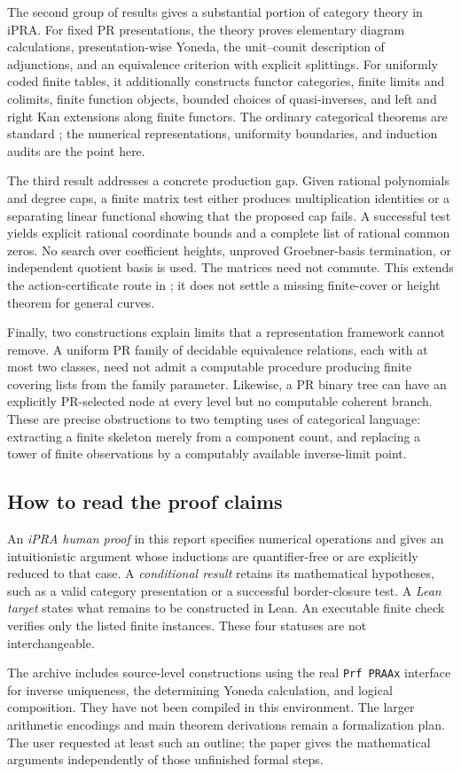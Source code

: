 The second group of results gives a substantial portion of category theory in
iPRA. For fixed PR presentations, the theory proves elementary diagram
calculations, presentation-wise Yoneda, the unit--counit description of
adjunctions, and an equivalence criterion with explicit splittings. For
uniformly coded finite tables, it additionally constructs functor categories,
finite limits and colimits, finite function objects, bounded choices of
quasi-inverses, and left and right Kan extensions along finite functors.
The ordinary categorical theorems are standard \cite{riehl2016}; the numerical
representations, uniformity boundaries, and induction audits are the point here.

The third result addresses a concrete production gap. Given rational
polynomials and degree caps, a finite matrix test either produces multiplication
identities or a separating linear functional showing that the proposed cap
fails. A successful test yields explicit rational coordinate bounds and a
complete list of rational common zeros. No search over coefficient heights,
unproved Groebner-basis termination, or independent quotient basis is used.
The matrices need not commute. This extends the action-certificate route in
\cite{repo-witnesses}; it does not settle a missing finite-cover or height theorem
for general curves.

Finally, two constructions explain limits that a representation framework
cannot remove. A uniform PR family of decidable equivalence relations, each
with at most two classes, need not admit a computable procedure producing
finite covering lists from the family parameter.
Likewise, a PR binary tree can have an explicitly PR-selected node at every
level but no computable coherent branch. These are precise obstructions to
two tempting uses of categorical language: extracting a finite skeleton merely
from a component count, and replacing a tower of finite observations by a
computably available inverse-limit point.

\subsection{How to read the proof claims}

An \emph{iPRA human proof} in this report specifies numerical operations and
gives an intuitionistic argument whose inductions are quantifier-free or are
explicitly reduced to that case. A \emph{conditional result} retains its
mathematical hypotheses, such as a valid category presentation or a successful
border-closure test. A \emph{Lean target} states what remains to be constructed
in Lean. An executable finite check verifies only the listed finite instances.
These four statuses are not interchangeable.

The archive includes source-level constructions using the real
\texttt{Prf PRAAx} interface for inverse uniqueness, the determining Yoneda
calculation, and logical composition. They have not been compiled in this
environment. The larger arithmetic encodings and main theorem derivations
remain a formalization plan. The user requested at least such an outline;
the paper gives the mathematical arguments independently of those unfinished
formal steps.
